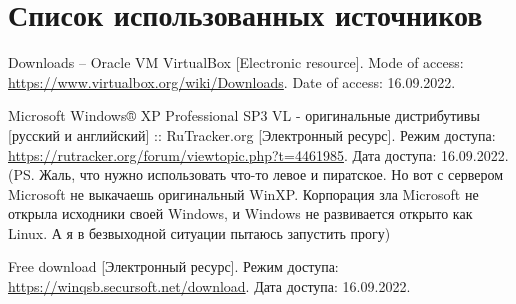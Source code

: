 \newpage

\begingroup
  \section*{Список использованных источников}

  \renewcommand{\addcontentsline}[3]{}%
  \renewcommand{\section}[2]{}%

  \begin{thebibliography}{}
    Downloads – Oracle VM VirtualBox
    [Electronic resource].
    Mode of access: \url{https://www.virtualbox.org/wiki/Downloads}.
    Date of access: 16.09.2022.

    Microsoft Windows® XP Professional SP3 VL - оригинальные дистрибутивы [русский и английский] :: RuTracker.org
    [Электронный ресурс].
    Режим доступа: \url{https://rutracker.org/forum/viewtopic.php?t=4461985}.
    Дата доступа: 16.09.2022.
    (PS. Жаль, что нужно использовать что-то левое и пиратское.
    Но вот с сервером Microsoft не выкачаешь оригинальный WinXP.
    Корпорация зла Microsoft не открыла исходники своей Windows,
    и Windows не развивается открыто как Linux.
    А я в безвыходной ситуации пытаюсь запустить прогу)

    Free download
    [Электронный ресурс].
    Режим доступа: \url{https://winqsb.secursoft.net/download}.
    Дата доступа: 16.09.2022. 
  \end{thebibliography}
\endgroup

\begingroup
  \section*{Литература, чтобы писать в \LaTeX}
  \addcontentsline{toc}{section}{Литература, чтобы писать в LaTeX}

  \renewcommand{\addcontentsline}[3]{}%
  \renewcommand{\section}[2]{}%

